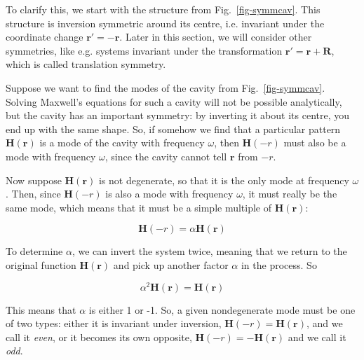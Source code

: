 To clarify this, we start with the structure from Fig.~\ref{fig-symmcav}. This structure is inversion symmetric around its centre, i.e. invariant under the coordinate change ${\mathbf r}' = -{\mathbf r}$. Later in this section, we will consider other symmetries, like e.g. systems invariant under the transformation ${\mathbf r}' = {\mathbf r} + {\mathbf R}$, which is called translation symmetry.

Suppose we want to find the modes of the cavity from Fig.~\ref{fig-symmcav}. Solving Maxwell's equations for such a cavity will not be possible analytically, but the cavity has an important symmetry: by inverting it about its centre, you end up with the same shape. So, if somehow we find that a particular pattern ${\mathbf H({\mathbf r})}$ is a mode of the cavity with frequency $\omega$, then ${\mathbf H({\mathbf -r})}$ must also be a mode with frequency $\omega$, since the cavity cannot tell ${\mathbf r}$ from ${\mathbf -r}$.

Now suppose ${\mathbf H({\mathbf r})}$ is not degenerate, so that it is the only mode at frequency $\omega$. Then, since ${\mathbf H({\mathbf -r})}$ is also a mode with frequency $\omega$, it must really be the same mode, which means that it must be a simple multiple of ${\mathbf H({\mathbf r})}$:

\begin{equation}
{\mathbf H({\mathbf -r})} = \alpha {\mathbf H({\mathbf r})}
\end{equation} 

To determine $\alpha$, we can invert the system twice, meaning that we return to the original function ${\mathbf H({\mathbf r})}$ and pick up another factor $\alpha$ in the process. So

\begin{equation}
\alpha^2 {\mathbf H({\mathbf r})} = {\mathbf H({\mathbf r})}
\end{equation} 

\noindent{}This means that $\alpha$ is either 1 or -1. So, a given nondegenerate mode must be one of two types: either it is invariant under inversion, ${\mathbf H({\mathbf -r})} = {\mathbf H({\mathbf r})}$, and we call it \emph{even}, or it becomes its own opposite, ${\mathbf H({\mathbf -r})} = - {\mathbf H({\mathbf r})}$ and we call it \emph{odd}.

